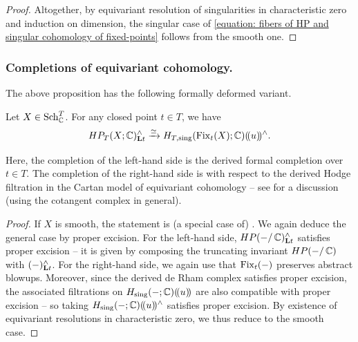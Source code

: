 \begin{proof}
Altogether, by equivariant resolution of singularities in characteristic zero and induction on dimension, the singular case of \eqref{equation: fibers of HP and singular cohomology of fixed-points} follows from the smooth one.
\end{proof}

\subsubsection{Completions of equivariant cohomology.}
The above proposition has the following formally deformed variant.
\begin{proposition}\label{proposition: fibers of HP and singular cohomology -- deformed}
Let $X \in \operatorname{Sch}^{T}_{\operatorname{\mathbb{C}}}$. For any closed point $t \in T$, we have
\begin{equation}\label{equation: completed version HP}
  HP_T(X; \operatorname{\mathbb{C}})^{\wedge}_{\mathbf{L} t} \xrightarrow{\simeq} H_{T, \mathrm{sing}}(\operatorname{Fix}_t(X); \operatorname{\mathbb{C}}) (\!( u )\!)^{\wedge}.
\end{equation}
\end{proposition}
\begin{remark}
Here, the completion of the left-hand side is the derived formal completion over $t \in T$. The completion of the right-hand side is with respect to the derived Hodge filtration in the Cartan model of equivariant cohomology -- see \cite[Example 2.1.10, Definition 4.2.3]{Chen20} for a discussion (using the cotangent complex in general).
\end{remark}
\begin{proof}
If $X$ is smooth, the statement is (a special case of) \cite[Theorem D, Theorem 4.3.2]{Chen20}. We again deduce the general case by proper excision. For the left-hand side, $HP(-/\operatorname{\mathbb{C}})^{\wedge}_{\mathbf{L} t}$ satisfies proper excision -- it is given by composing the truncating invariant $HP(-/ \operatorname{\mathbb{C}})$ with $(-)^{\wedge}_{\mathbf{L} t}$. For the right-hand side, we again use that $\operatorname{Fix}_t(-)$ preserves abstract blowups. Moreover, since the derived de Rham complex satisfies proper excision, the associated filtrations on $H_{\mathrm{sing}}(-; \operatorname{\mathbb{C}}) (\!( u )\!)$ are also compatible with proper excision -- so taking $H_{\mathrm{sing}}(-; \operatorname{\mathbb{C}})(\!( u )\!)^{\wedge}$ satisfies proper excision. By existence of equivariant resolutions in characteristic zero, we thus reduce to the smooth case.
\end{proof}


